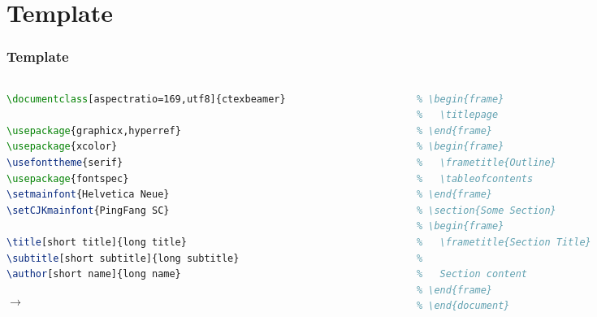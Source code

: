 \documentclass[aspectratio=169,utf8]{ctexbeamer}
\begin{document}
\section{Template}
\begin{frame}[fragile]
  \frametitle{Template}

  \begin{columns}[t]
    \begin{column}{.5\textwidth}

\begin{lstlisting}[language=TeX]
% !TEX program = xelatex
\documentclass[aspectratio=169,utf8]{ctexbeamer}

\usepackage{graphicx,hyperref}
\usepackage{xcolor}
\usefonttheme{serif}
\usepackage{fontspec}
\setmainfont{Helvetica Neue}
\setCJKmainfont{PingFang SC}

\title[short title]{long title}
\subtitle[short subtitle]{long subtitle}
\author[short name]{long name}

\end{lstlisting}

        $\longrightarrow$
    \end{column}

    \begin{column}{.35\textwidth}

\begin{lstlisting}[language=TeX, firstnumber=14]
% \begin{document}
% \begin{frame}
%   \titlepage
% \end{frame}
% \begin{frame}
%   \frametitle{Outline}
%   \tableofcontents
% \end{frame}
% \section{Some Section}
% \begin{frame}
%   \frametitle{Section Title}
% 
%   Section content
% \end{frame}
% \end{document}
\end{lstlisting}
      
    \end{column}
    
  \end{columns}

\end{frame}
\end{document}
